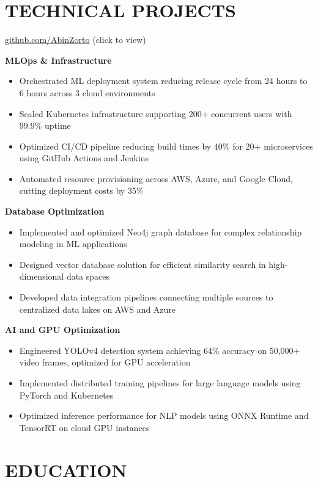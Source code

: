 \documentclass[10pt,a4paper]{article}
\begin{document}
\section*{TECHNICAL PROJECTS} 
\href{https://github.com/AbinZorto}{github.com/AbinZorto} {\small\color{secondary}(click to view)}

\textbf{MLOps \& Infrastructure}
\begin{itemize}
    \item Orchestrated ML deployment system reducing release cycle from 24 hours to 6 hours across 3 cloud environments
    \item Scaled Kubernetes infrastructure supporting 200+ concurrent users with 99.9\% uptime
    \item Optimized CI/CD pipeline reducing build times by 40\% for 20+ microservices using GitHub Actions and Jenkins
    \item Automated resource provisioning across AWS, Azure, and Google Cloud, cutting deployment costs by 35\%
\end{itemize}

\textbf{Database Optimization}
\begin{itemize}
    \item Implemented and optimized Neo4j graph database for complex relationship modeling in ML applications
    \item Designed vector database solution for efficient similarity search in high-dimensional data spaces
    \item Developed data integration pipelines connecting multiple sources to centralized data lakes on AWS and Azure
\end{itemize}

\textbf{AI and GPU Optimization}
\begin{itemize}
    \item Engineered YOLOv4 detection system achieving 64\% accuracy on 50,000+ video frames, optimized for GPU acceleration
    \item Implemented distributed training pipelines for large language models using PyTorch and Kubernetes
    \item Optimized inference performance for NLP models using ONNX Runtime and TensorRT on cloud GPU instances
\end{itemize}

\section*{EDUCATION}
\end{document}
